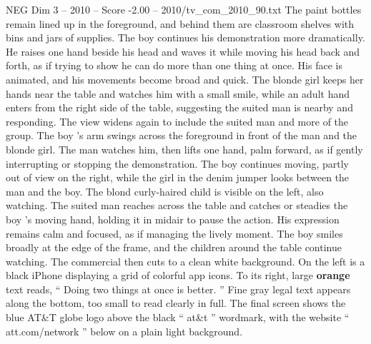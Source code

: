 \begin{textsample}{NEG Dim 3 – 2010 – Score -2.00 – 2010/tv\_com\_2010\_90.txt}
The paint bottles remain lined up in the foreground, and behind them are classroom shelves with bins and jars of supplies.
The boy continues his demonstration more dramatically.
He raises one hand beside his head and waves it while moving his head back and forth, as if trying to show he can do more than one thing at once.
His face is animated, and his movements become broad and quick.
The blonde girl keeps her hands near the table and watches him with a small smile, while an adult hand enters from the right side of the table, suggesting the suited man is nearby and responding.
The view widens again to include the suited man and more of the group.
The boy ’s arm swings across the foreground in front of the man and the blonde girl.
The man watches him, then lifts one hand, palm forward, as if gently interrupting or stopping the demonstration.
The boy continues moving, partly out of view on the right, while the girl in the denim jumper looks between the man and the boy.
The blond curly-haired child is visible on the left, also watching.
The suited man reaches across the table and catches or steadies the boy ’s moving hand, holding it in midair to pause the action.
His expression remains calm and focused, as if managing the lively moment.
The boy smiles broadly at the edge of the frame, and the children around the table continue watching.
The commercial then cuts to a clean white background.
On the left is a black iPhone displaying a grid of colorful app icons.
To its right, large \textbf{orange} text reads, “ Doing two things at once is better. ” Fine gray legal text appears along the bottom, too small to read clearly in full.
The final screen shows the blue AT\&T globe logo above the black “ at\&t ” wordmark, with the website “ att.com/network ” below on a plain light background.

\end{textsample}
